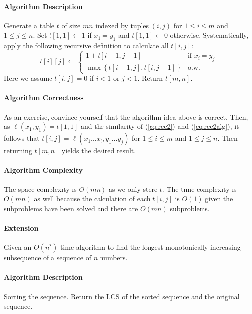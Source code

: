 \documentclass[11pt]{article}
\theoremstyle{plain}
\theoremstyle{definition}
\numberwithin{equation}{section}
\numberwithin{figure}{section}
\begin{document}
\paragraph{Algorithm Description} Generate a table $t$ of size $mn$ indexed by tuples $(i,j)$ for $1 \leq i \leq m$ and $1 \leq j \leq n$. Set $t[1,1] \leftarrow 1$ if $x_1 = y_1$ and $t[1,1] \leftarrow 0$ otherwise. Systematically, apply the following recursive definition to calculate all $t[i,j]$:
\begin{equation}
t[i][j] \leftarrow \begin{cases} 1 + t[i-1,j-1] & \text{if } x_i = y_j \\ \max \left\{ t[i-1,j], t[i,j-1] \right\} & \text{o.w.}\end{cases} \label{eq:rec2alg}
\end{equation}
Here we assume $t[i,j] = 0$ if $i < 1$ or $j < 1$. Return $t[m,n]$.

\paragraph{Algorithm Correctness} As an exercise, convince yourself that the algorithm idea above is correct. Then, as $\ell(x_1,y_1) = t[1,1]$ and the similarity of (\ref{eq:rec2}) and (\ref{eq:rec2alg}), it follows that $t[i,j] = \ell(x_1 \ldots x_i, y_1 \ldots y_j)$ for $1 \leq i \leq m$ and $1 \leq j \leq n$. Then returning $t[m,n]$ yields the desired result.

\paragraph{Algorithm Complexity} The space complexity is $O(mn)$ as we only store $t$. The time complexity is $O(mn)$ as well because the calculation of each $t[i,j]$ is $O(1)$ given the subproblems have been solved and there are $O(mn)$ subproblems.

\paragraph{Extension} Given an $O(n^2)$ time algorithm to find the longest monotonically increasing subsequence of a sequence of $n$ numbers.

\paragraph{Algorithm Description} Sorting the sequence. Return the LCS of the sorted sequence and the original sequence.
\end{document}
